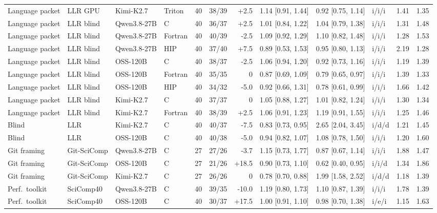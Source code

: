 \begin{widetable}[!p]
\begin{tabular}{@{}llllrrrlllrr@{}}
Language packet & LLR GPU & Kimi-K2.7 & Triton & 40 & 38/39 & +2.5 & 1.14 [0.91, 1.44] & 0.92 [0.75, 1.14] & i/i/i & 1.41 & 1.35 \\
Language packet & LLR blind & Qwen3.8-27B & C & 40 & 36/37 & +2.5 & 1.01 [0.84, 1.22] & 1.04 [0.79, 1.38] & i/i/i & 1.31 & 1.48 \\
Language packet & LLR blind & Qwen3.8-27B & Fortran & 40 & 40/39 & -2.5 & 1.09 [0.92, 1.29] & 1.10 [0.82, 1.48] & i/i/i & 1.28 & 1.53 \\
Language packet & LLR blind & Qwen3.8-27B & HIP & 40 & 37/40 & +7.5 & 0.89 [0.53, 1.53] & 0.95 [0.80, 1.13] & i/i/i & 2.19 & 1.28 \\
Language packet & LLR blind & OSS-120B & C & 40 & 38/37 & -2.5 & 1.06 [0.94, 1.20] & 0.92 [0.73, 1.16] & i/i/i & 1.19 & 1.39 \\
Language packet & LLR blind & OSS-120B & Fortran & 40 & 35/35 & 0 & 0.87 [0.69, 1.09] & 0.79 [0.65, 0.97] & i/i/i & 1.39 & 1.33 \\
Language packet & LLR blind & OSS-120B & HIP & 40 & 34/32 & -5.0 & 0.92 [0.66, 1.31] & 0.78 [0.61, 0.99] & i/i/i & 1.66 & 1.42 \\
Language packet & LLR blind & Kimi-K2.7 & C & 40 & 37/37 & 0 & 1.05 [0.88, 1.27] & 1.01 [0.82, 1.24] & i/i/i & 1.30 & 1.34 \\
Language packet & LLR blind & Kimi-K2.7 & Fortran & 40 & 38/39 & +2.5 & 1.06 [0.91, 1.23] & 1.19 [0.91, 1.55] & i/i/i & 1.25 & 1.46 \\
Blind & LLR & Kimi-K2.7 & C & 40 & 40/37 & -7.5 & 0.83 [0.73, 0.95] & 2.65 [2.04, 3.45] & i/d/d & 1.21 & 1.45 \\
Blind & LLR & OSS-120B & C & 40 & 40/38 & -5.0 & 0.94 [0.82, 1.07] & 1.08 [0.78, 1.50] & i/i/i & 1.20 & 1.60 \\
Git framing & Git-SciComp & Qwen3.8-27B & C & 27 & 27/26 & -3.7 & 1.15 [0.73, 1.77] & 0.87 [0.67, 1.14] & i/i/i & 1.88 & 1.47 \\
Git framing & Git-SciComp & OSS-120B & C & 27 & 21/26 & +18.5 & 0.90 [0.73, 1.10] & 0.62 [0.40, 0.95] & i/i/d & 1.34 & 1.86 \\
Git framing & Git-SciComp & Kimi-K2.7 & C & 27 & 26/26 & 0 & 0.78 [0.70, 0.88] & 1.99 [1.58, 2.52] & i/d/d & 1.18 & 1.39 \\
Perf.\ toolkit & SciComp40 & Qwen3.8-27B & C & 40 & 39/35 & -10.0 & 1.19 [0.80, 1.73] & 1.10 [0.87, 1.39] & i/i/i & 1.78 & 1.39 \\
Perf.\ toolkit & SciComp40 & OSS-120B & C & 40 & 30/37 & +17.5 & 1.00 [0.91, 1.10] & 0.98 [0.70, 1.38] & i/e/i & 1.15 & 1.63 \\

\end{tabular}
\end{widetable}
